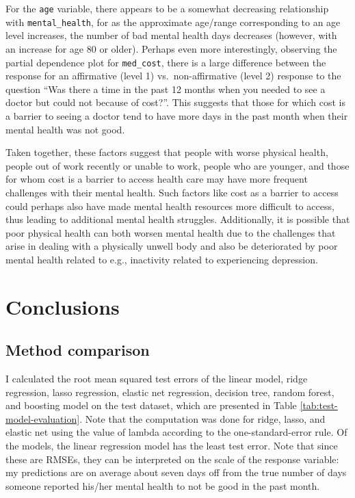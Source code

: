 \documentclass[
]{article}
\begin{document}
For the \texttt{age} variable, there appears to be a somewhat decreasing relationship with \texttt{mental\_health}, for as the approximate age/range corresponding to an age level increases, the number of bad mental health days decreases (however, with an increase for age 80 or older). Perhaps even more interestingly, observing the partial dependence plot for \texttt{med\_cost}, there is a large difference between the response for an affirmative (level 1) vs.~non-affirmative (level 2) response to the question ``Was there a time in the past 12 months when you needed to see a doctor but could not because of cost?''. This suggests that those for which cost is a barrier to seeing a doctor tend to have more days in the past month when their mental health was not good.

Taken together, these factors suggest that people with worse physical health, people out of work recently or unable to work, people who are younger, and those for whom cost is a barrier to access health care may have more frequent challenges with their mental health. Such factors like cost as a barrier to access could perhaps also have made mental health resources more difficult to access, thus leading to additional mental health struggles. Additionally, it is possible that poor physical health can both worsen mental health due to the challenges that arise in dealing with a physically unwell body and also be deteriorated by poor mental health related to e.g., inactivity related to experiencing depression.

\hypertarget{conclusions}{%
\section{Conclusions}\label{conclusions}}

\hypertarget{method-comparison}{%
\subsection{Method comparison}\label{method-comparison}}

I calculated the root mean squared test errors of the linear model, ridge regression, lasso regression, elastic net regression, decision tree, random forest, and boosting model on the test dataset, which are presented in Table \ref{tab:test-model-evaluation}. Note that the computation was done for ridge, lasso, and elastic net using the value of lambda according to the one-standard-error rule. Of the models, the linear regression model has the least test error. Note that since these are RMSEs, they can be interpreted on the scale of the response variable: my predictions are on average about seven days off from the true number of days someone reported his/her mental health to not be good in the past month.
\end{document}
